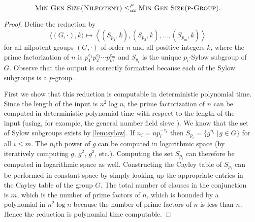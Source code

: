 \documentclass{article}
\begin{document}

\begin{proposition}
  \begin{equation*}
    \textsc{Min Gen Size(Nilpotent)} \leq_{ctt}^P \textsc{Min Gen Size(p-Group)}.
  \end{equation*}
\end{proposition}
\begin{proof}
  Define the reduction by
  \begin{equation*}
    \langle (G, \cdot), k \rangle \mapsto \left\langle (S_{p_1}, k), (S_{p_2}, k), \dotsc, (S_{p_m}, k) \right\rangle
  \end{equation*}
  for all nilpotent groups $(G, \cdot)$ of order $n$ and all positive integers $k$, where the prime factorization of $n$ is $p_1^{e_1}p_2^{e_2}\dotsb p_m^{e_m}$ and $S_{p_i}$ is the unique $p_i$-Sylow subgroup of $G$.
  Observe that the output is correctly formatted because each of the Sylow subgroups is a $p$-group.

  First we show that this reduction is computable in deterministic polynomial time.
  Since the length of the input is $n^2 \log n$, the prime factorization of $n$ can be computed in deterministic polynomial time with respect to the length of the input (using, for example, the general number field sieve \cite{llmp93}).
  We know that the set of Sylow subgroups exists by \autoref{lem:sylow}.
  If $n_i = n p_i^{-e_i}$ then $S_{p_i} = \{g^{n_i} \, | \, g \in G\}$ for all $i \leq m$.
  The $n_i$th power of $g$ can be computed in logarithmic space (by iteratively computing $g$, $g^2$, $g^3$, etc.).
  Computing the set $S_{p_i}$ can therefore be computed in logarithmic space as well.
  Constructing the Cayley table of $S_{p_i}$ can be performed in constant space by simply looking up the appropriate entries in the Cayley table of the group $G$.
  The total number of clauses in the conjunction is $m$, which is the number of prime factors of $n$, which is bounded by a polynomial in $n^2 \log n$ because the number of prime factors of $n$ is less than $n$.
  Hence the reduction is polynomial time computable.


\end{proof}
\end{document}
